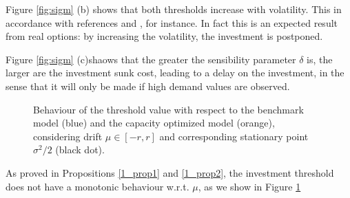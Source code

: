 Figure \ref{fig:sigm} (b) shows that both thresholds increase with volatility. This in accordance with references \cite{hagspiel:cap} and \cite{rita}, for instance. In fact this is an expected result from real options: by increasing the volatility, the investment is postponed.

Figure \ref{fig:sigm} (c)shaows that the greater the sensibility parameter $\delta$ is, the larger are the investment sunk cost, leading to a delay on the investment, in the sense that it will only be made if high demand values are observed.

\begin{figure}[!htb]
	\begin{subfigmatrix}{2}
	\end{subfigmatrix}
	\caption{Behaviour of the threshold value with respect to the benchmark model (blue) and the capacity optimized model (orange), considering drift $\mu \in [-r, r]$ and corresponding stationary point $\sigma^2/2$ (black dot).}
	\label{fig:mu}
\end{figure}

As proved in Propositions \ref{1_prop1} and \ref{1_prop2}, the investment threshold does not have a monotonic behaviour w.r.t. $\mu$, as we show in Figure \ref{fig:mu}

